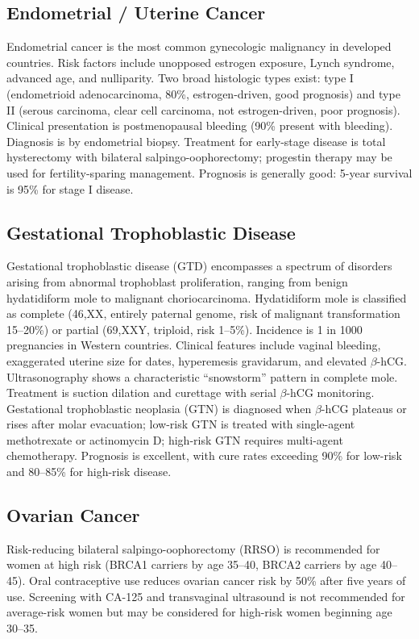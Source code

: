\subsection{Endometrial / Uterine Cancer}
\label{sec:Endometrial Cancer}
Endometrial cancer is the most common gynecologic malignancy in developed countries. Risk factors include unopposed estrogen exposure, Lynch syndrome, advanced age, and nulliparity. Two broad histologic types exist: type I (endometrioid adenocarcinoma, 80\%, estrogen-driven, good prognosis) and type II (serous carcinoma, clear cell carcinoma, not estrogen-driven, poor prognosis). Clinical presentation is postmenopausal bleeding (90\% present with bleeding). Diagnosis is by endometrial biopsy. Treatment for early-stage disease is total hysterectomy with bilateral salpingo-oophorectomy; progestin therapy may be used for fertility-sparing management. Prognosis is generally good: 5-year survival is 95\% for stage I disease.

\subsection{Gestational Trophoblastic Disease}
\label{sec:Gestational Trophoblastic Disease}
Gestational trophoblastic disease (GTD) encompasses a spectrum of disorders arising from abnormal trophoblast proliferation, ranging from benign hydatidiform mole to malignant choriocarcinoma. Hydatidiform mole is classified as complete (46,XX, entirely paternal genome, risk of malignant transformation 15--20\%) or partial (69,XXY, triploid, risk 1--5\%). Incidence is 1 in 1000 pregnancies in Western countries. Clinical features include vaginal bleeding, exaggerated uterine size for dates, hyperemesis gravidarum, and elevated $\beta$-hCG. Ultrasonography shows a characteristic ``snowstorm'' pattern in complete mole. Treatment is suction dilation and curettage with serial $\beta$-hCG monitoring. Gestational trophoblastic neoplasia (GTN) is diagnosed when $\beta$-hCG plateaus or rises after molar evacuation; low-risk GTN is treated with single-agent methotrexate or actinomycin D; high-risk GTN requires multi-agent chemotherapy. Prognosis is excellent, with cure rates exceeding 90\% for low-risk and 80--85\% for high-risk disease.

\subsection{Ovarian Cancer}
\label{sec:obstetric:Ovarian Cancer}
Risk-reducing bilateral salpingo-oophorectomy (RRSO) is recommended for women at high risk (BRCA1 carriers by age 35--40, BRCA2 carriers by age 40--45). Oral contraceptive use reduces ovarian cancer risk by 50\% after five years of use. Screening with CA-125 and transvaginal ultrasound is not recommended for average-risk women but may be considered for high-risk women beginning age 30--35.

